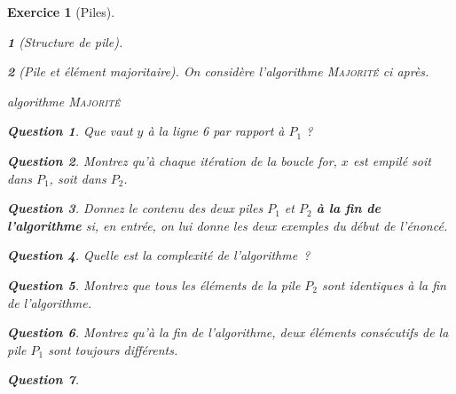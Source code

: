 \documentclass{article}
\theoremstyle{exostyle}
\newtheorem{exo}{Exercice}
\theoremstyle{partiestyle}
\newtheorem{partie}{}[exo]
\theoremstyle{questionstyle}
\newtheorem{questionpartie}{Question}[partie]
\begin{document}
\begin{exo}[Piles]
\begin{partie}[Structure de pile]
    
    \end{partie}
    \begin{partie}[Pile et élément majoritaire]
    
        On considère l'algorithme \textsc{Majorité} ci après.
        \begin{algorithm}[h!]
            \DontPrintSemicolon
        \caption{algorithme \textsc{Majorité}}
        \end{algorithm}

        \begin{questionpartie}
                Que vaut $y$ à la ligne 6 par rapport à $P_1$ ?
        \end{questionpartie}
        \begin{questionpartie}
            Montrez qu'à chaque itération de la boucle for, $x$ est empilé soit dans $P_1$, soit dans $P_2$.
        \end{questionpartie}
        \begin{questionpartie}
            Donnez le contenu des deux piles $P_1$ et $P_2$ {\bf à la fin de l'algorithme} si, en entrée, on lui donne les deux exemples du début de l'énoncé.
        \end{questionpartie}
        \begin{questionpartie}
            Quelle est la complexité de l'algorithme~?
        \end{questionpartie}
        \begin{questionpartie}
            Montrez que tous les éléments de la pile $P_2$ sont identiques à la fin de l'algorithme. 
        \end{questionpartie}
        \begin{questionpartie}
            Montrez qu'à la fin de l'algorithme, deux éléments consécutifs de la pile $P_1$ sont toujours différents.        
        \end{questionpartie}
        \begin{questionpartie}
        

\end{questionpartie}
\end{partie}
\end{exo}
\end{document}
